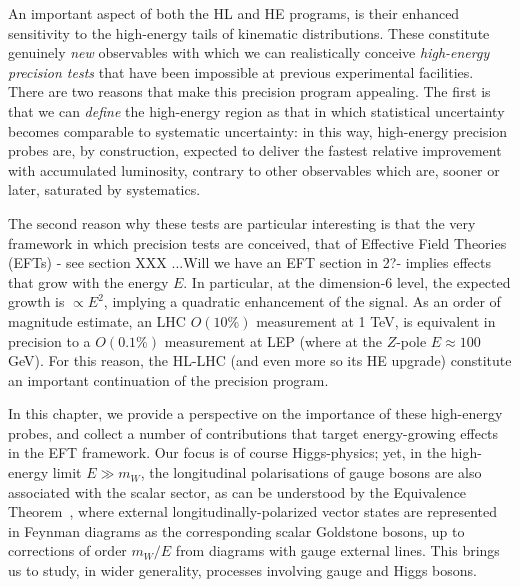 An important aspect of both the HL and HE programs, is their enhanced sensitivity to the high-energy tails of kinematic distributions.  
These constitute genuinely \emph{new} observables with which we can realistically  conceive \emph{high-energy precision tests} that have been impossible at previous experimental facilities.
 There are two reasons that make this precision program appealing. The first is that we can \emph{define} the high-energy region as that in which statistical uncertainty becomes comparable to systematic uncertainty: in this way, high-energy precision probes are, by construction, expected to deliver the fastest relative improvement with accumulated luminosity, contrary to other observables which are, sooner or later, saturated by systematics.

The second reason why these tests are particular interesting is that the very framework in which precision tests are conceived, that of Effective Field Theories (EFTs) - {\color{red}  see section XXX ...Will we have an EFT section in 2?}-  implies effects that grow with the energy $E$. In particular, at the dimension-6 level, the expected growth is $\propto E^2$, implying a quadratic enhancement of the signal. 
As an order of magnitude estimate, an LHC $O(10\%)$ measurement at 1 TeV, is equivalent in precision to a $O(0.1\%)$ measurement at LEP (where at the $Z$-pole $E\approx 100$ GeV). For this reason, the HL-LHC (and even more so its HE upgrade) constitute an important continuation of the precision program. 

In this chapter, we provide a perspective on the importance of these high-energy probes, and collect a number of contributions that target energy-growing effects in the EFT framework.
Our focus is of course Higgs-physics; yet, in the  high-energy  limit $E\gg m_{W}$, the longitudinal polarisations of gauge bosons are also associated with the scalar sector, as can be understood by the Equivalence Theorem~\cite{Chanowitz:1985hj,Wulzer:2013mza}, where external longitudinally-polarized vector states are represented in Feynman diagrams as the corresponding
scalar Goldstone bosons, up to corrections of order $m_W/E$ from diagrams with gauge external lines.
This brings us to study, in wider generality, processes involving gauge  and Higgs bosons. %

